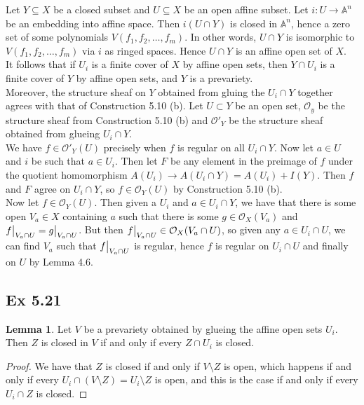 \documentclass{article}
\newcommand\restr[2]{{%
  \left.\kern-\nulldelimiterspace %
  #1 %
  \vphantom{\big|} %
  \right|_{#2} %
  }}
\theoremstyle{definition}
\newtheorem{lemma}[theorem]{Lemma}
\newcommand{\A}{\mathbb{A}}
\newcommand{\An}{\A^n}
\begin{document}
Let $Y \subseteq X$ be a closed subset and $U \subseteq X$ be an open affine
subset. Let $i : U \to \An$ be an embedding into affine space. Then $i(U \cap
Y)$ is closed in $\An$, hence a zero set of some polynomials $V(f_1, f_2,
\ldots, f_m)$. In other words, $U \cap Y$ is isomorphic to $V(f_1, f_2, \ldots,
f_m)$ via $i$ as ringed spaces. Hence $U \cap Y$ is an affine open set of $X$. \\

It follows that if $U_i$ is a finite cover of $X$ by affine open sets, then $Y
\cap U_i$ is a finite cover of $Y$ by affine open sets, and $Y$ is a
prevariety. \\

Moreover, the structure sheaf on $Y$ obtained from gluing the $U_i \cap Y$
together agrees with that of Construction 5.10 (b). Let $U \subset Y$ be an
open set, $\mathcal{O}_y$ be the structure sheaf from Construction 5.10 (b) and
$\mathcal{O}'_Y$ be the structure sheaf obtained from glueing $U_i \cap Y$. \\

We have $f \in \mathcal{O}'_Y(U)$ precisely when $f$ is regular on all $U_i
\cap Y$. Now let $a \in U$ and $i$ be such that $a \in U_i$. Then let $F$ be
any element in the preimage of $f$ under the quotient homomorphism $A(U_i) \to
A(U_i \cap Y) = A(U_i) + I(Y)$. Then $f$ and $F$ agree on $U_i \cap Y$, so $f
\in \mathcal{O}_Y(U)$ by Construction 5.10 (b). \\

Now let $f \in \mathcal{O}_Y(U)$. Then given a $U_i$ and $a \in U_i \cap Y$, we
have that there is some open $V_a \in X$ containing $a$ such that there is some
$g \in \mathcal{O}_X(V_a)$ and $\restr{f}{V_a \cap U} = \restr{g}{V_a \cap U}$.
But then $\restr{f}{V_a \cap U} \in \mathcal{O}_X(V_a \cap U)$, so given any $a
\in U_i \cap U$, we can find $V_a$ such that $\restr{f}{V_a \cap U}$ is
regular, hence $f$ is regular on $U_i \cap U$ and finally on $U$ by Lemma 4.6.



\subsection*{Ex 5.21} 

\begin{lemma}
	Let $V$ be a prevariety obtained by glueing the affine open sets $U_i$.
	Then $Z$ is closed in $V$ if and only if every $Z \cap U_i$ is closed. 
\end{lemma}
\begin{proof}
	We have that $Z$ is closed if and only if $V \setminus Z$ is open, which
	happens if and only if every $U_i \cap (V \setminus Z) = U_i \setminus Z$
	is open, and this is the case if and only if every $U_i \cap Z$ is closed.
\end{proof}
\end{document}
